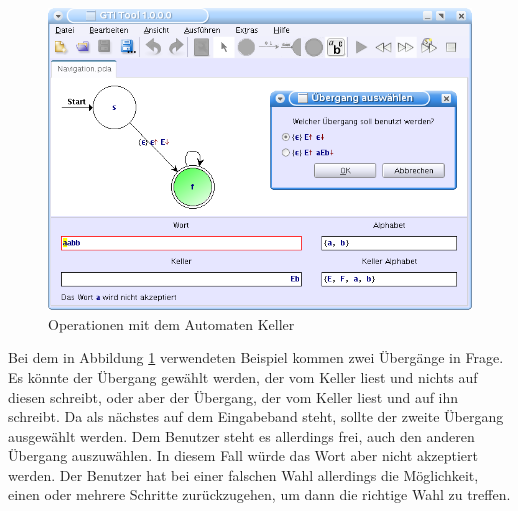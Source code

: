 \begin{figure}[h!]
\begin{center}
\includegraphics[width=12cm]{../images/grammar_pda.png}
\caption{Operationen mit dem Automaten Keller}
\label{FigureGrammarPDA}
\end{center}
\end{figure}
\vspace{10pt}

Bei dem in Abbildung \ref{FigureGrammarPDA} verwendeten Beispiel kommen zwei
Übergänge in Frage. Es könnte der Übergang gewählt werden, der  vom
Keller liest und nichts auf diesen schreibt, oder aber der Übergang, der
 vom Keller liest und  auf ihn schreibt.
Da  als nächstes auf dem Eingabeband steht, sollte der zweite Übergang
ausgewählt werden. Dem Benutzer steht es allerdings frei, auch den anderen
Übergang auszuwählen. In diesem Fall würde das Wort
 aber nicht akzeptiert werden. Der
Benutzer hat bei einer falschen Wahl allerdings die Möglichkeit, einen oder
mehrere Schritte zurückzugehen, um dann die richtige Wahl zu
treffen.\vspace{10pt}
